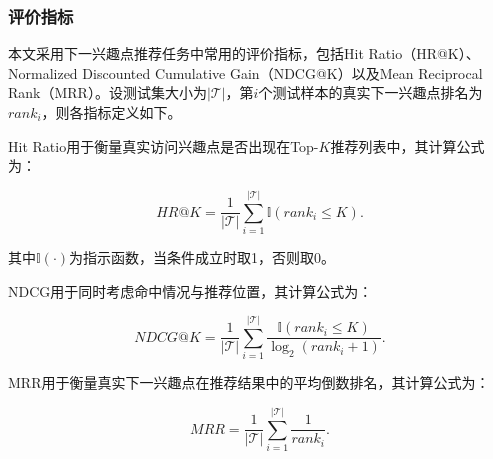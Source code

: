 \documentclass{rjthesis}
\begin{document}


\subsubsection{评价指标}

本文采用下一兴趣点推荐任务中常用的评价指标，包括Hit Ratio（HR@K）、Normalized Discounted Cumulative Gain（NDCG@K）以及Mean Reciprocal Rank（MRR）。设测试集大小为$|\mathcal{T}|$，第$i$个测试样本的真实下一兴趣点排名为$rank_i$，则各指标定义如下。

Hit Ratio用于衡量真实访问兴趣点是否出现在Top-$K$推荐列表中，其计算公式为：

\begin{equation}
HR@K=\frac{1}{|\mathcal{T}|}\sum_{i=1}^{|\mathcal{T}|}\mathbb{I}(rank_i\leq K).
\end{equation}

其中$\mathbb{I}(\cdot)$为指示函数，当条件成立时取1，否则取0。

NDCG用于同时考虑命中情况与推荐位置，其计算公式为：

\begin{equation}
NDCG@K=\frac{1}{|\mathcal{T}|}\sum_{i=1}^{|\mathcal{T}|}\frac{\mathbb{I}(rank_i\leq K)}{\log_2(rank_i+1)}.
\end{equation}

MRR用于衡量真实下一兴趣点在推荐结果中的平均倒数排名，其计算公式为：

\begin{equation}
MRR=\frac{1}{|\mathcal{T}|}\sum_{i=1}^{|\mathcal{T}|}\frac{1}{rank_i}.
\end{equation}
\end{document}
